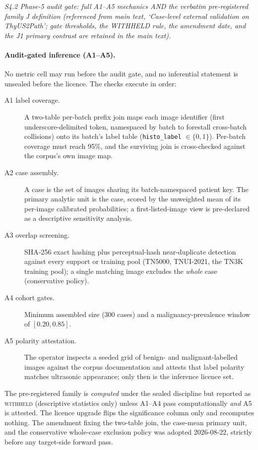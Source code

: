 \documentclass[11pt]{article}
\begin{document}
\noindent\emph{S4.2 Phase-5 audit gate: full A1--A5 mechanics AND the verbatim pre-registered family J definition (referenced from main text, `Case-level external validation on ThyUS2Path'; gate thresholds, the WITHHELD rule, the amendment date, and the J1 primary contrast are retained in the main text).}

\paragraph{Audit-gated inference (A1--A5).} No metric cell may run before
the audit gate, and no inferential statement is unsealed before the
licence. The checks execute in order:
\begin{description}
  \item[A1 label coverage.] A two-table per-batch prefix join maps each
  image identifier (first underscore-delimited token, namespaced by
  batch to forestall cross-batch collisions) onto its batch's label
  table (\texttt{histo\_label} $\in \{0, 1\}$). Per-batch coverage must
  reach 95\%, and the surviving join is cross-checked against the
  corpus's own image map.
  \item[A2 case assembly.] A case is the set of images sharing its
  batch-namespaced patient key. The primary analytic unit is the case,
  scored by the unweighted mean of its per-image calibrated
  probabilities; a first-listed-image view is pre-declared as a
  descriptive sensitivity analysis.
  \item[A3 overlap screening.] SHA-256 exact hashing plus perceptual-hash
  near-duplicate detection against every support or training pool
  (TN5000, TNUI-2021, the TN3K training pool); a single matching image
  excludes the \emph{whole} case (conservative policy).
  \item[A4 cohort gates.] Minimum assembled size (300 cases) and a
  malignancy-prevalence window of $[0.20, 0.85]$.
  \item[A5 polarity attestation.] The operator inspects a seeded grid of
  benign- and malignant-labelled images against the corpus documentation
  and attests that label polarity matches ultrasonic appearance; only
  then is the inference licence set.
\end{description}
The pre-registered family is \emph{computed} under the sealed discipline
but reported as \textsc{withheld} (descriptive statistics only) unless
A1--A4 pass computationally \emph{and} A5 is attested. The licence
upgrade flips the significance column only and recomputes nothing. The
amendment fixing the two-table join, the case-mean primary unit, and the
conservative whole-case exclusion policy was adopted 2026-08-22, strictly
before any target-side forward pass.
\end{document}
